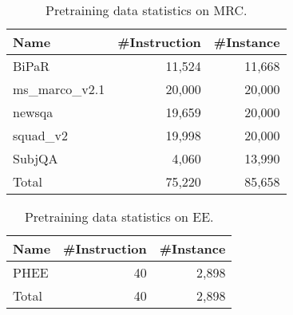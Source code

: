 \begin{table}
    \centering
    \begin{tabular}[]{lrr}
        \toprule
        Name & \#Instruction & \#Instance \\
        \midrule
        BiPaR & 11,524 & 11,668 \\
        ms\_marco\_v2.1 & 20,000 & 20,000 \\
        newsqa & 19,659 & 20,000 \\
        squad\_v2 & 19,998 & 20,000 \\
        SubjQA & 4,060 & 13,990 \\
        \midrule
        Total & 75,220 & 85,658 \\
        \bottomrule
    \end{tabular}
    \caption{
        Pretraining data statistics on MRC.
    }
    \label{tab:data-statistics-mrc}
\end{table}

\begin{table}
    \centering
    \begin{tabular}[]{lrr}
        \toprule
        Name & \#Instruction & \#Instance \\
        \midrule
        PHEE & 40 & 2,898 \\
        \midrule
        Total & 40 & 2,898 \\
        \bottomrule
    \end{tabular}
    \caption{
        Pretraining data statistics on EE.
    }
    \label{tab:data-statistics-ee}
\end{table}
